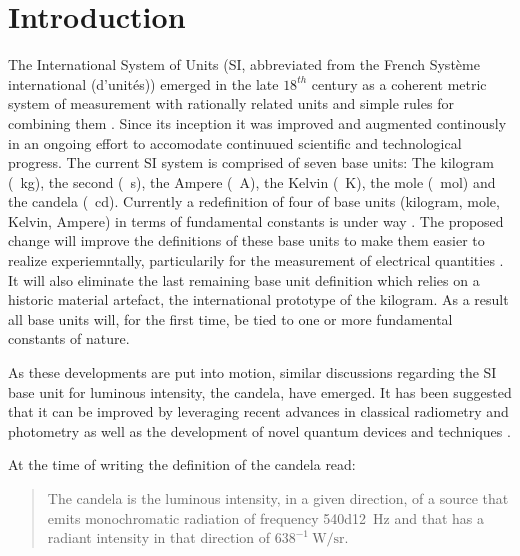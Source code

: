 

\chapter{Introduction}	\label{ch::introduction}

		The International System of Units (SI, abbreviated from the French Système international (d'unités)) emerged in the late $18^{th}$ century as a coherent metric system of measurement with rationally related units and simple rules for combining them \cite{zwinckels::1}. Since its inception it was improved and augmented continously in an ongoing effort to accomodate continuued scientific and technological progress. The current SI system is comprised of seven base units: The kilogram (\SI{}{\kg}), the second (\SI{}{\s}), the Ampere (\SI{}{\ampere}), the Kelvin (\SI{}{\kelvin}), the mole (\SI{}{\mole}) and the candela (\SI{}{\candela}). Currently a redefinition of four of base units (kilogram, mole, Kelvin, Ampere) in terms of fundamental constants is under way \cite{zwinckels::3, Milton, Martin (14 November 2016). Highlights in the work of the BIPM in 2016}. The proposed change will improve the definitions of these base units to make them easier to realize experiemntally, particularily for the measurement of electrical quantities \cite{zwinckels::paper}. It will also eliminate the last remaining base unit definition which relies on a historic material artefact, the international prototype of the kilogram. As a result all base units will, for the first time, be tied to one or more fundamental constants of nature.

		As these developments are put into motion, similar discussions regarding the SI base unit for luminous intensity, the candela, have emerged. It has been suggested that it can be improved by leveraging recent advances in classical radiometry and photometry as well as the development of novel quantum devices and techniques \cite{Cheung2007}.

		At the time of writing the definition of the candela read:

		\begin{quote}
		The candela is the luminous intensity, in a given direction, of a source that emits monochromatic radiation of frequency \SI{540d12}{\hertz} and that has a radiant intensity in that direction of $638^{-1} \SI{}{\watt\per\steradian}$.
	  \end{quote}

